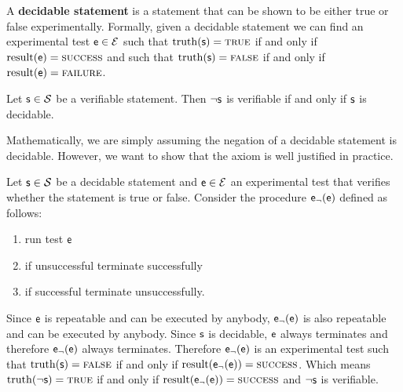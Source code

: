 \documentclass[11pt,letterpaper,fleqn]{memoir} %
\begin{document}
\begin{mathSection}
	\begin{defn}
		A \textbf{decidable statement} is a statement that can be shown to be either true or false experimentally. Formally, given a decidable statement we can find an experimental test $\mathsf{e} \in \mathcal{E}$ such that $\operatorname{truth}(\mathsf{s})=\textsc{true}$ if and only if $\operatorname{result}(\mathsf{e})=\textsc{success}$ and such that $\operatorname{truth}(\mathsf{s})=\textsc{false}$ if and only if $\operatorname{result}(\mathsf{e})=\textsc{failure}$.
	\end{defn}
	\begin{axiom}
		Let $\mathsf{s} \in \mathcal{S}$ be a verifiable statement. Then $\neg\mathsf{s}$ is verifiable if and only if $\mathsf{s}$ is decidable.
	\end{axiom}
	\begin{justification}
		Mathematically, we are simply assuming the negation of a decidable statement is decidable. However, we want to show that the axiom is well justified in practice.
		
		Let $\mathsf{s} \in \mathcal{S}$ be a decidable statement and $\mathsf{e} \in \mathcal{E}$ an experimental test that verifies whether the statement is true or false. Consider the procedure $\mathsf{e}_\neg(\mathsf{e})$ defined as follows:
		\begin{enumerate}
			\item run test $\mathsf{e}$
			\item if unsuccessful terminate successfully
			\item if successful terminate unsuccessfully.
		\end{enumerate}
		Since $\mathsf{e}$ is repeatable and can be executed by anybody, $\mathsf{e}_\neg(\mathsf{e})$ is also repeatable and can be executed by anybody. Since $\mathsf{s}$ is decidable, $\mathsf{e}$ always terminates and therefore $\mathsf{e}_\neg(\mathsf{e})$ always terminates.  Therefore $\mathsf{e}_\neg(\mathsf{e})$ is an experimental test such that $\operatorname{truth}(\mathsf{s})=\textsc{false}$ if and only if $\operatorname{result}(\mathsf{e}_\neg(\mathsf{e}))=\textsc{success}$. Which means $\operatorname{truth}(\neg\mathsf{s})=\textsc{true}$ if and only if $\operatorname{result}(\mathsf{e}_\neg(\mathsf{e}))=\textsc{success}$ and $\neg\mathsf{s}$ is verifiable.
		

\end{justification}
\end{mathSection}
\end{document}
